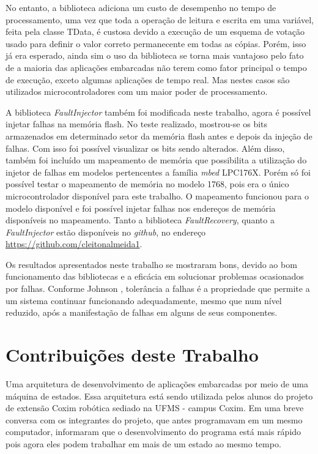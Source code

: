 No entanto, a biblioteca adiciona um custo de desempenho no tempo de processamento, uma vez que toda a operação de leitura e escrita em uma variável, feita pela classe TData, é custosa devido a execução de um esquema de votação usado para definir o valor correto permanecente em todas as cópias. Porém, isso já era esperado, ainda sim o uso da biblioteca se torna mais vantajoso pelo fato de a maioria das aplicações embarcadas não terem como fator principal o tempo de execução, exceto algumas aplicações de tempo real. Mas nestes casos são utilizados microcontroladores com um maior poder de processamento. 

A biblioteca \textit{FaultInjector} também foi modificada neste trabalho, agora é possível injetar falhas na memória flash. No teste realizado, mostrou-se os bits armazenados em determinado setor da memória flash antes e depois da injeção de falhas. Com isso foi possível visualizar os bits sendo alterados. Além disso, também foi incluído um mapeamento de memória que possibilita a utilização do injetor de falhas em modelos pertencentes a família \textit{mbed} LPC176X. Porém só foi possível testar o mapeamento de memória no modelo 1768, pois era o único microcontrolador disponível para este trabalho. O mapeamento funcionou para o modelo disponível e foi possível injetar falhas nos endereços de memória disponíveis no mapeamento. Tanto a biblioteca \textit{FaultRecovery}, quanto a \textit{FaultInjector} estão disponíveis no \textit{github}, no endereço \url{https://github.com/cleitonalmeida1}.

Os resultados apresentados neste trabalho se mostraram bons, devido ao bom funcionamento das bibliotecas e a eficácia em solucionar problemas ocasionados por falhas. Conforme Johnson \cite{Johnson:1984}, tolerância a falhas é a propriedade que permite a um sistema continuar funcionando adequadamente, mesmo que num nível reduzido, após a manifestação de falhas em alguns de seus componentes.

\section {Contribuições deste Trabalho}

Uma arquitetura de desenvolvimento de aplicações embarcadas por meio de uma máquina de estados. Essa arquitetura está sendo utilizada pelos alunos do projeto de extensão Coxim robótica sediado na UFMS - campus Coxim. Em uma breve conversa  com os integrantes do projeto, que antes programavam em um mesmo computador, informaram que o desenvolvimento do programa está mais rápido pois agora eles podem trabalhar em mais de um estado ao mesmo tempo.

